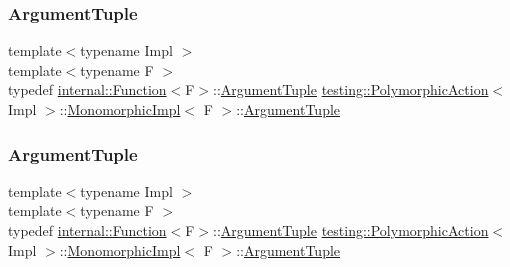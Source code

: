 \subsubsection{\texorpdfstring{ArgumentTuple}{ArgumentTuple}\hspace{0.1cm}{\footnotesize\ttfamily [1/3]}}
{\footnotesize\ttfamily template$<$typename Impl $>$ \\
template$<$typename F $>$ \\
typedef \mbox{\hyperlink{structtesting_1_1internal_1_1_function}{internal\+::\+Function}}$<$F$>$\+::\mbox{\hyperlink{classtesting_1_1_action_interface_af72720d864da4d606629e83edc003511}{Argument\+Tuple}} \mbox{\hyperlink{classtesting_1_1_polymorphic_action}{testing\+::\+Polymorphic\+Action}}$<$ Impl $>$\+::\mbox{\hyperlink{classtesting_1_1_polymorphic_action_1_1_monomorphic_impl}{Monomorphic\+Impl}}$<$ F $>$\+::\mbox{\hyperlink{classtesting_1_1_action_interface_af72720d864da4d606629e83edc003511}{Argument\+Tuple}}}

\mbox{\label{classtesting_1_1_polymorphic_action_1_1_monomorphic_impl_a2d6ef64336f1d5cdac893fb040048c8c}} 
\subsubsection{\texorpdfstring{ArgumentTuple}{ArgumentTuple}\hspace{0.1cm}{\footnotesize\ttfamily [2/3]}}
{\footnotesize\ttfamily template$<$typename Impl $>$ \\
template$<$typename F $>$ \\
typedef \mbox{\hyperlink{structtesting_1_1internal_1_1_function}{internal\+::\+Function}}$<$F$>$\+::\mbox{\hyperlink{classtesting_1_1_action_interface_af72720d864da4d606629e83edc003511}{Argument\+Tuple}} \mbox{\hyperlink{classtesting_1_1_polymorphic_action}{testing\+::\+Polymorphic\+Action}}$<$ Impl $>$\+::\mbox{\hyperlink{classtesting_1_1_polymorphic_action_1_1_monomorphic_impl}{Monomorphic\+Impl}}$<$ F $>$\+::\mbox{\hyperlink{classtesting_1_1_action_interface_af72720d864da4d606629e83edc003511}{Argument\+Tuple}}}

